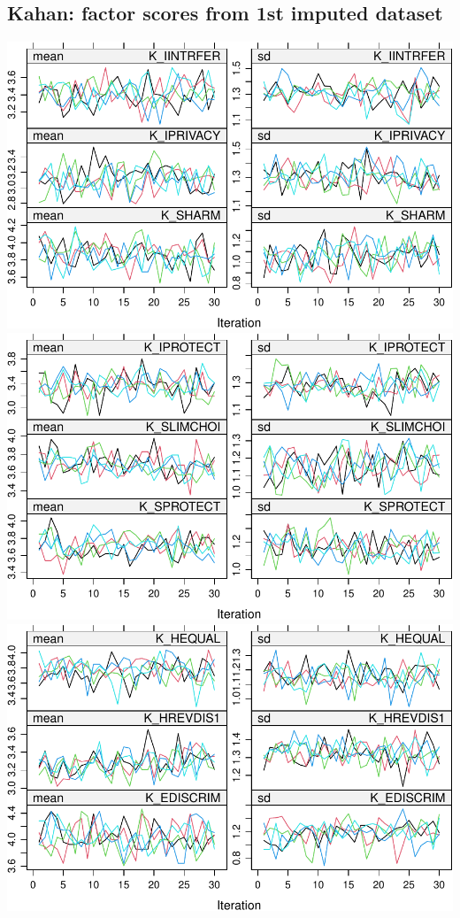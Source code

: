 \documentclass[
]{article}
\begin{document}
\hypertarget{kahan-factor-scores-from-1st-imputed-dataset}{%
\subsection{Kahan: factor scores from 1st imputed
dataset}\label{kahan-factor-scores-from-1st-imputed-dataset}}

\includegraphics{withmice_files/figure-latex/unnamed-chunk-15-1.pdf}
\includegraphics{withmice_files/figure-latex/unnamed-chunk-15-2.pdf}
\includegraphics{withmice_files/figure-latex/unnamed-chunk-15-3.pdf}
\end{document}
